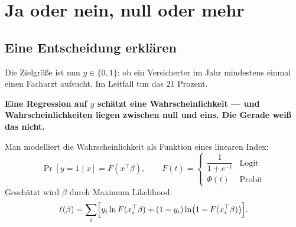 \chapter{Ja oder nein, null oder mehr}

\section{Eine Entscheidung erklären}

\begin{merksatz}
Die Zielgröße ist nun $y \in \{0,1\}$: ob ein Versicherter im Jahr mindestens einmal einen Facharzt aufsucht. Im Leitfall tun das $21$ Prozent.

\begin{center}
\begin{minipage}{0.9\textwidth}
\textbf{Eine Regression auf $y$ schätzt eine Wahrscheinlichkeit --- und Wahrscheinlichkeiten liegen zwischen null und eins. Die Gerade weiß das nicht.}
\end{minipage}
\end{center}
\end{merksatz}

\begin{definition}
Man modelliert die Wahrscheinlichkeit als Funktion eines linearen Index:
\[ \Pr[y = 1 \mid x] = F(x^{\top}\beta), \qquad F(t) = \begin{cases} \dfrac{1}{1+e^{-t}} & \text{Logit}\\[8pt] \Phi(t) & \text{Probit}\end{cases} \]
Geschätzt wird $\beta$ durch Maximum Likelihood:
\[ \ell(\beta) = \sum_i \Bigl[y_i\ln F(x_i^{\top}\beta) + (1-y_i)\ln\bigl(1-F(x_i^{\top}\beta)\bigr)\Bigr] . \]
\end{definition}

